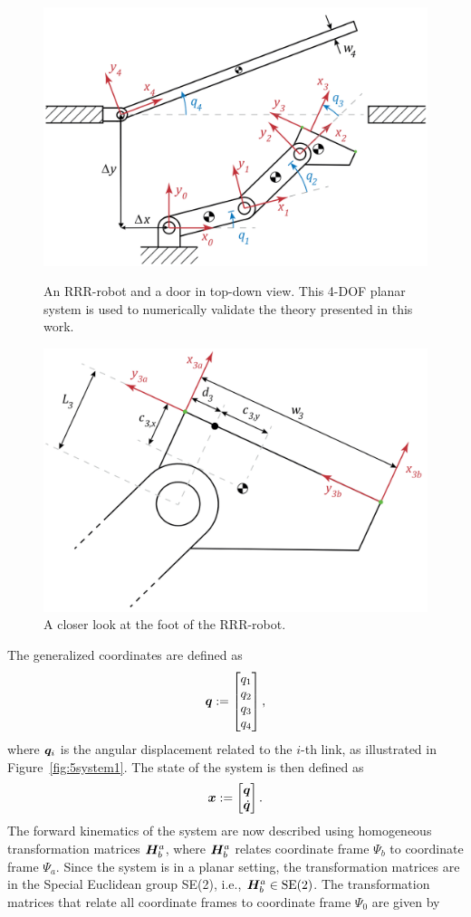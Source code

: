 \documentclass[../DC2019003Bouma.tex]{subfiles}
\begin{document}
%
%
\begin{figure}[bt!]
\centering
\includegraphics[width=.7\textwidth]{system.PNG}\caption{An RRR-robot and a door in top-down view. This 4-DOF planar system is used to numerically validate the theory presented in this work.}\label{fig:5system1}
\includegraphics[width=.7\textwidth]{system2.PNG}\caption{A closer look at the foot of the RRR-robot.}
\label{fig:5system2}
\end{figure}

The generalized coordinates are defined as 
\begin{align}
{\boldsymbol{q}} := \begin{bmatrix}
q_1\\q_2\\q_3\\q_4
\end{bmatrix},
\end{align}
where ${\boldsymbol{q}}_i$ is the angular displacement related to the $i$-th link, as illustrated in Figure~\ref{fig:5system1}. The state of the system is then defined as
\begin{align}
{\boldsymbol{x}} := \begin{bmatrix}
{\boldsymbol{q}}\\\dot{{\boldsymbol{q}}}
\end{bmatrix}.
\end{align}
The forward kinematics of the system are now described using homogeneous transformation matrices ${\boldsymbol{H}}^a_b$, where ${\boldsymbol{H}}^a_b$ relates coordinate frame $\Psi_b$ to coordinate frame $\Psi_a$. Since the system is in a planar setting, the transformation matrices are in the Special Euclidean group SE(2), i.e., ${\boldsymbol{H}}^a_b\in \textnormal{SE}(2)$. The transformation matrices that relate all coordinate frames to coordinate frame $\Psi_0$ are given by
\end{document}
